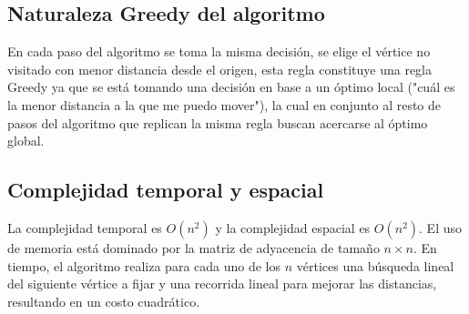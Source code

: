 \subsection{Naturaleza Greedy del algoritmo}

En cada paso del algoritmo se toma la misma decisión, se elige el vértice no visitado con menor distancia desde el origen, esta regla constituye una
regla Greedy ya que se está tomando una decisión en base a un óptimo local ("cuál es la menor distancia a la que me puedo mover"), la cual en conjunto 
al resto de pasos del algoritmo que replican la misma regla buscan acercarse al óptimo global.

\subsection{Complejidad temporal y espacial}

La complejidad temporal es $O(n^2)$ y la complejidad espacial es $O(n^2)$. El uso de memoria está dominado por la matriz de adyacencia de tamaño
$n \times n$. En tiempo, el algoritmo realiza para cada uno de los $n$ vértices una búsqueda lineal del siguiente vértice a fijar y una recorrida
lineal para mejorar las distancias, resultando en un costo cuadrático.